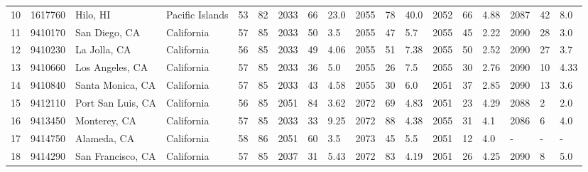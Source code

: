 \begin{longtable}{llllllllllllllllll}
10 &          1617760 &                    Hilo, HI &          Pacific Islands &              53 &       82 &                      2033 &   66 &   23.0 &     2055 &   78 &   40.0 &                          2052 &  66 &  4.88 &     2087 &   42 &   8.0 \\
11 &          9410170 &               San Diego, CA &               California &              57 &       85 &                      2033 &   50 &    3.5 &     2055 &   47 &    5.7 &                          2055 &  45 &  2.22 &     2090 &   28 &   3.0 \\
12 &          9410230 &                La Jolla, CA &               California &              56 &       85 &                      2033 &   49 &   4.06 &     2055 &   51 &   7.38 &                          2055 &  50 &  2.52 &     2090 &   27 &   3.7 \\
13 &          9410660 &             Los Angeles, CA &               California &              57 &       85 &                      2033 &   36 &    5.0 &     2055 &   26 &    7.5 &                          2055 &  30 &  2.76 &     2090 &   10 &  4.33 \\
14 &          9410840 &            Santa Monica, CA &               California &              57 &       85 &                      2033 &   43 &   4.58 &     2055 &   30 &    6.0 &                          2051 &  37 &  2.85 &     2090 &   13 &   3.6 \\
15 &          9412110 &           Port San Luis, CA &               California &              56 &       85 &                      2051 &   84 &   3.62 &     2072 &   69 &   4.83 &                          2051 &  23 &  4.29 &     2088 &    2 &   2.0 \\
16 &          9413450 &                Monterey, CA &               California &              57 &       85 &                      2033 &   33 &   9.25 &     2072 &   88 &   4.38 &                          2055 &  31 &   4.1 &     2086 &    6 &   4.0 \\
17 &          9414750 &                 Alameda, CA &               California &              58 &       86 &                      2051 &   60 &    3.5 &     2073 &   45 &    5.5 &                          2051 &  12 &   4.0 &        - &    - &     - \\
18 &          9414290 &           San Francisco, CA &               California &              57 &       85 &                      2037 &   31 &   5.43 &     2072 &   83 &   4.19 &                          2051 &  26 &  4.25 &     2090 &    8 &   5.0 \\

\end{longtable}
